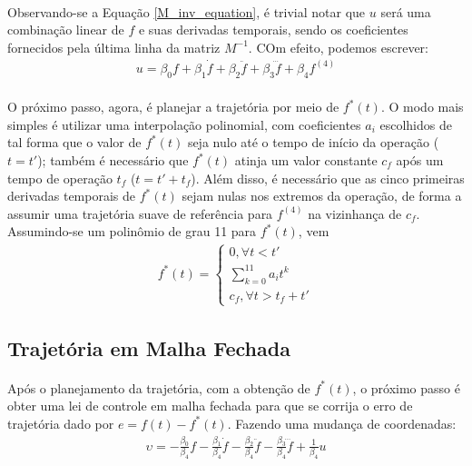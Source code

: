 \documentclass[a4paper,11pt]{scrartcl} %
\numberwithin{equation}{section} %
\numberwithin{figure}{section} %
\numberwithin{table}{section} %
\begin{document}
\paragraph{} Observando-se a Equação \ref{M_inv_equation}, é trivial notar que $u$ será uma combinação linear de $f$ e suas derivadas temporais, sendo os coeficientes fornecidos pela última linha da matriz $M^{-1}$. COm efeito, podemos escrever:
\begin{align}
\label{u_desc}
	u = \beta_0 f + \beta_1 \dot{f} + \beta_2 \ddot{f} + \beta_3 \dddot{f} + \beta_4 f^{(4)}
\end{align}

\paragraph{} O próximo passo, agora, é planejar a trajetória por meio de $f^*(t)$. O modo mais simples é utilizar uma interpolação polinomial, com coeficientes $a_i$ escolhidos de tal forma que o valor de $f^*(t)$ seja nulo até o tempo de início da operação ($t = t'$); também é necessário que $f^*(t)$ atinja um valor constante $c_f$ após um tempo de operação $t_f$ ($t = t' + t_f$). Além disso, é necessário que as cinco primeiras derivadas temporais de $f^*(t)$ sejam nulas nos extremos da operação, de forma a assumir uma trajetória suave de referência para $f^{(4)}$ na vizinhança de $c_f$. Assumindo-se um polinômio de grau 11 para $f^*(t)$, vem
\begin{align}
f^*(t) =
\begin{cases}
0, \forall t < t' \\
\sum_{k = 0}^{11} \! a_{i}t^{k} \\
c_f, \forall t > t_f + t'
\end{cases}
\end{align}

\subsection{Trajetória em Malha Fechada}
\paragraph{} Após o planejamento da trajetória, com a obtenção de $f^*(t)$, o próximo passo é obter uma lei de controle em malha fechada para que se corrija o erro de trajetória dado por $e = f(t) - f^*(t)$. Fazendo uma mudança de coordenadas:
\begin{align}
\label{upsilon_ref}
	\upsilon = -\frac{\beta_0}{\beta_4}f -\frac{\beta_1}{\beta_4}\dot{f} -\frac{\beta_2}{\beta_4}\ddot{f} -\frac{\beta_3}{\beta_4}\dddot{f} + \frac{1}{\beta_4}u
\end{align}
\end{document}
